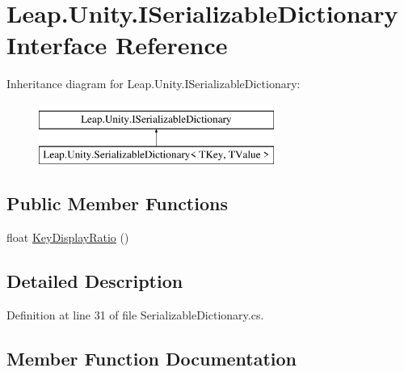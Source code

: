 \hypertarget{interface_leap_1_1_unity_1_1_i_serializable_dictionary}{}\section{Leap.\+Unity.\+I\+Serializable\+Dictionary Interface Reference}
\label{interface_leap_1_1_unity_1_1_i_serializable_dictionary}
Inheritance diagram for Leap.\+Unity.\+I\+Serializable\+Dictionary\+:\begin{figure}[H]
\begin{center}
\leavevmode
\includegraphics[height=2.000000cm]{interface_leap_1_1_unity_1_1_i_serializable_dictionary}
\end{center}
\end{figure}
\subsection*{Public Member Functions}
\begin{DoxyCompactItemize}
\item 
float \mbox{\hyperlink{interface_leap_1_1_unity_1_1_i_serializable_dictionary_adaa691139a897ab05b48b4d57b083d0d}{Key\+Display\+Ratio}} ()
\end{DoxyCompactItemize}


\subsection{Detailed Description}


Definition at line 31 of file Serializable\+Dictionary.\+cs.



\subsection{Member Function Documentation}
\mbox{\label{interface_leap_1_1_unity_1_1_i_serializable_dictionary_adaa691139a897ab05b48b4d57b083d0d}} 
